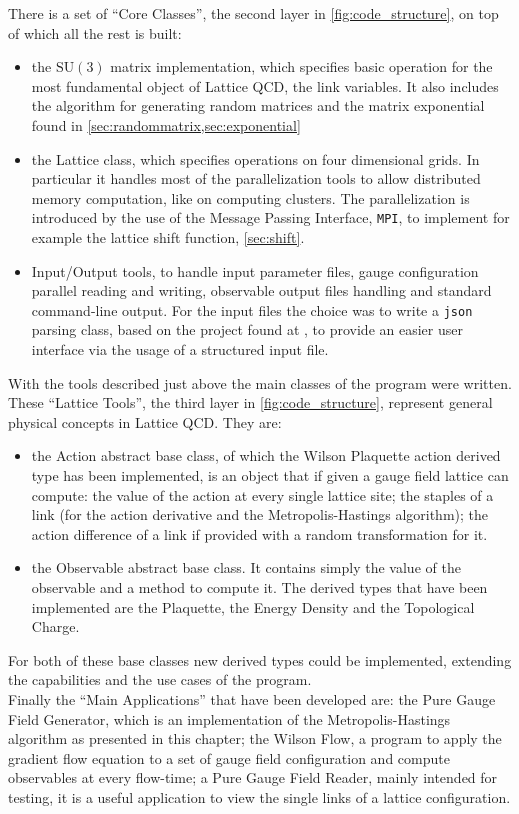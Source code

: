 
There is a set of ``Core Classes'', the second layer in \cref{fig:code_structure}, on top of which all the rest is built:
\begin{itemize} 
    \item the $\mathrm{SU}(3)$ matrix implementation, which specifies basic operation for the most fundamental object of Lattice QCD, the link variables. It also includes the algorithm for generating random matrices and the matrix exponential found in \cref{sec:randommatrix,sec:exponential} 
    \item the Lattice class, which specifies operations on four dimensional grids. In particular it handles most of the parallelization tools to allow distributed memory computation, like on computing clusters. The parallelization is introduced by the use of the Message Passing Interface, \texttt{MPI}, to implement for example the lattice shift function, \cref{sec:shift}.
    \item Input/Output tools, to handle input parameter files, gauge configuration parallel reading and writing, observable output files handling and standard command-line output. For the input files the choice was to write a \texttt{json} parsing class, based on the project found at \cite{_nlohmann/json}, to provide an easier user interface via the usage of a  structured input file.
\end{itemize}

With the tools described just above the main classes of the program were written. These ``Lattice Tools'', the third layer in \cref{fig:code_structure}, represent general physical concepts in Lattice QCD. They are:
\begin{itemize}
    \item the Action abstract base class, of which the Wilson Plaquette action derived type has been implemented, is an object that if given a gauge field lattice can compute: the value of the action at every single lattice site; the staples of a link (for the action derivative and the Metropolis-Hastings algorithm); the action difference of a link if provided with a random transformation for it.
    \item the Observable abstract base class. It contains simply the value of the observable and a method to compute it. The derived types that have been implemented are the Plaquette, the Energy Density and the Topological Charge.  
\end{itemize}
For both of these base classes new derived types could be implemented, extending the capabilities and the use cases of the program. \\
Finally the ``Main Applications'' that have been developed are: the Pure Gauge Field Generator, which is an implementation of the Metropolis-Hastings algorithm as presented in this chapter; the Wilson Flow, a program to apply the gradient flow equation to a set of gauge field configuration and compute observables at every flow-time; a Pure Gauge Field Reader, mainly intended for testing, it is a useful application to view the single links of a lattice configuration.
